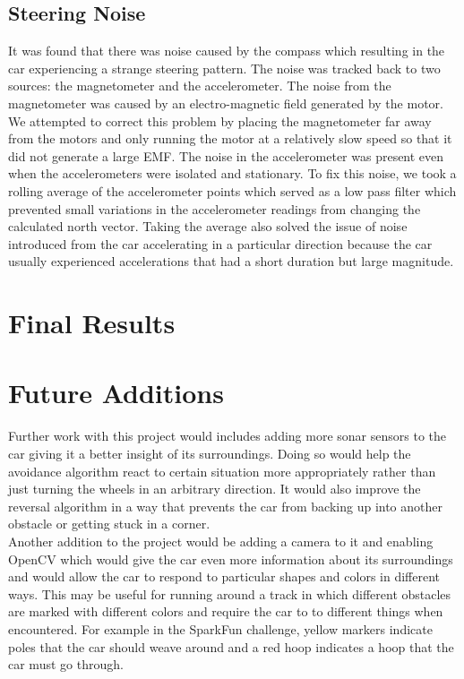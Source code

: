 \documentclass[final,letterpaper,singleside,12pt]{article}
\begin{document}
\subsection{Steering Noise} %
\label{sub:steering_noise}
It was found that there was noise caused by the compass which resulting in the car experiencing a strange steering pattern. The noise was tracked back to two sources: the magnetometer and the accelerometer. The noise from the magnetometer was caused by an electro-magnetic field generated by the motor. We attempted to correct this problem by placing the magnetometer far away from the motors and only running the motor at a relatively slow speed so that it did not generate a large EMF. The noise in the accelerometer was present even when the accelerometers were isolated and stationary. To fix this noise, we took a rolling average of the accelerometer points which served as a low pass filter which prevented small variations in the accelerometer readings from changing the calculated north vector. Taking the average also solved the issue of noise introduced from the car accelerating in a particular direction because the car usually experienced accelerations that had a short duration but large magnitude.

\pagebreak

\section{Final Results} %
\label{sec:final_results}

\pagebreak
\section{Future Additions} %
\label{sec:future}
Further work with this project would includes adding more sonar sensors to the car giving it a better insight of its surroundings. Doing so would help the avoidance algorithm react to certain situation more appropriately rather than just turning the wheels in an arbitrary direction. It would also improve the reversal algorithm in a way that prevents the car from backing up into another obstacle or getting stuck in a corner.\\
Another addition to the project would be adding a camera to it and enabling OpenCV which would give the car even more information about its surroundings and would allow the car to respond to particular shapes and colors in different ways. This may be useful for running around a track in which different obstacles are marked with different colors and require the car to to different things when encountered. For example in the SparkFun challenge, yellow markers indicate poles that the car should weave around and a red hoop indicates a hoop that the car must go through.
\end{document}
